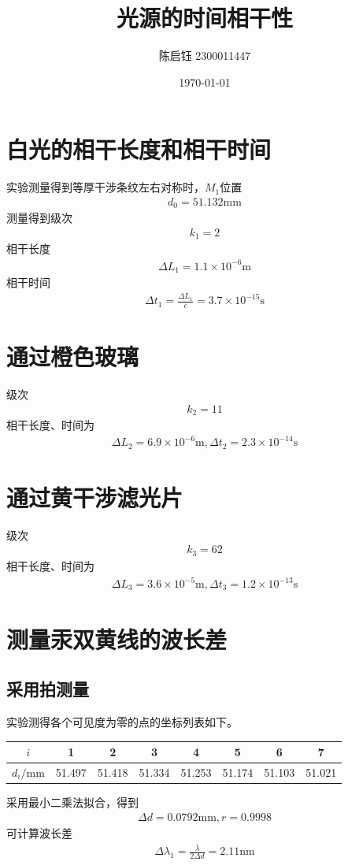 \documentclass{ctexart}
\title{光源的时间相干性}
\author{陈启钰\,\,2300011447}
\date{\today}
\begin{document}
	\maketitle
	\section{白光的相干长度和相干时间}
	实验测量得到等厚干涉条纹左右对称时，$M_1$位置
	\begin{align}
		d_0=51.132\mathrm{mm}
	\end{align}
	测量得到级次
	\begin{align}
		k_1=2
	\end{align}
	相干长度
	\begin{align}
		\Delta L_1=1.1\times10^{-6}\mathrm{m}
	\end{align}
	相干时间
	\begin{align}
		\Delta t_1=\frac{\Delta L_1}{c}=3.7\times 10^{-15}\mathrm{s}
	\end{align}
	\section{通过橙色玻璃}
	级次
	\begin{align}
		k_2=11
	\end{align}
	相干长度、时间为
	\begin{align}
		\Delta L_2=6.9\times10^{-6}\mathrm{m},\Delta t_2=2.3\times10^{-14}\mathrm{s}
	\end{align}
	\section{通过黄干涉滤光片}
	级次
	\begin{align}
		k_3=62
	\end{align}
	相干长度、时间为
	\begin{align}
		\Delta L_3=3.6\times10^{-5}\mathrm{m},\Delta t_3=1.2\times10^{-13}\mathrm{s}
	\end{align}
	\section{测量汞双黄线的波长差}
	\subsection{采用拍测量}
	实验测得各个可见度为零的点的坐标列表如下。
	\begin{table}[H]
		\begin{center}
			\begin{tabular}{c|ccccccc}
				$i$&1&2&3&4&5&6&7\\\hline
				$d_i/\mathrm{mm}$&51.497&51.418&51.334&51.253&51.174&51.103&51.021\\				
			\end{tabular}
		\end{center}
	\end{table}
	采用最小二乘法拟合，得到
	\begin{align}
		\Delta d=0.0792\mathrm{mm},r=0.9998
	\end{align}
	可计算波长差
	\begin{align}
		\Delta \lambda_1=\frac{\bar{\lambda}}{2\Delta d}=2.11\mathrm{nm}
	\end{align}
\end{document}

